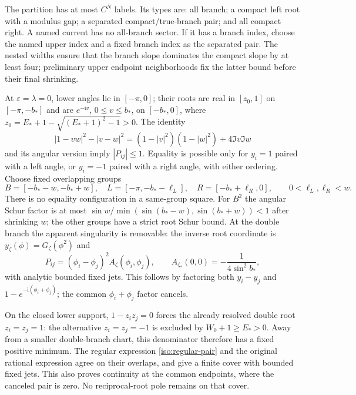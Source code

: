 \documentclass[11pt]{article}
\numberwithin{equation}{section}
\theoremstyle{definition}
\newcommand{\ii}{\mathrm i}
\newcommand{\eps}{\varepsilon}
\begin{document}
The partition has at most $C^N$ labels. Its types are: all branch; a
compact left root with a modulus gap; a separated compact/true-branch
pair; and all compact right. A named current has no all-branch sector.
If it has a branch index, choose the named upper index and a fixed branch
index as the separated pair. The nested widths ensure that the branch
slope dominates the compact slope by at least four; preliminary upper
endpoint neighborhoods fix the latter bound before their final shrinking.

At $\eps=\lambda=0$, lower angles lie in $[-\pi,0]$; their roots are
real in $[z_0,1]$ on $[-\pi,-b_*]$ and are $e^{-\ii v}$,
$0\le v\le b_*$, on $[-b_*,0]$, where
$z_0=E_*+1-\sqrt{(E_*+1)^2-1}>0$.
The identity
\begin{equation}
 |1-vw|^2-|v-w|^2
 =(1-|v|^2)(1-|w|^2)+4\Im v\Im w
 \label{iso:schur-gap}
\end{equation}
and its angular version imply $|P_{ij}|\le1$.
Equality is possible only for $y_i=1$ paired with a left angle, or
$y_i=-1$ paired with a right angle, with either ordering.
Choose fixed overlapping groups
\[
 B=[-b_*-w,-b_*+w],\quad
 L=[-\pi,-b_*-\ell_L],\quad R=[-b_*+\ell_R,0],
 \qquad0<\ell_L,\ell_R<w.
\]
There is no equality configuration in a same-group square.
For $B^2$ the angular Schur factor is at most
$\sin w/\min(\sin(b_*-w),\sin(b_*+w))<1$ after shrinking $w$;
the other groups have a strict root Schur bound. At the double branch
the apparent singularity is removable: the inverse root coordinate is
$y_\zeta(\phi)=G_\zeta(\phi^2)$ and
\begin{equation}
 P_{ij}=(\phi_i-\phi_j)^2 A_\zeta(\phi_i,\phi_j),
 \qquad A_{\zeta_*}(0,0)=-\frac1{4\sin^2b_*},
 \label{iso:regular-pair}
\end{equation}
with analytic bounded fixed jets. This follows by factoring both
$y_i-y_j$ and $1-e^{-\ii(\phi_i+\phi_j)}$; the common
$\phi_i+\phi_j$ factor cancels.

On the closed lower support, $1-z_i z_j=0$ forces the already resolved
double root $z_i=z_j=1$: the alternative $z_i=z_j=-1$ is excluded by
$W_0+1\ge E_*>0$. Away from a smaller double-branch chart, this
denominator therefore has a fixed positive minimum. The regular
expression \eqref{iso:regular-pair} and the original rational expression
agree on their overlaps, and give a finite cover with bounded fixed
jets. This also proves continuity at the common endpoints, where the
canceled pair is zero. No reciprocal-root pole remains on that cover.
\end{document}
